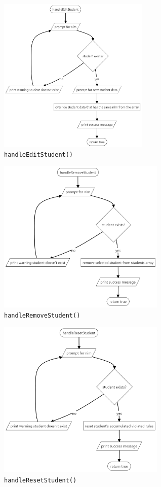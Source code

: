 \documentclass[12pt,titlepage]{article}
\begin{document}
\begin{figure}[h]
    \centering
    \includegraphics[width=7.2cm]{flowcharts/handle-edit-student.png}
    \caption{\texttt{handleEditStudent()}}
\end{figure}

\pagebreak

\begin{figure}[h]
    \centering
    \includegraphics[width=8cm]{flowcharts/handle-remove-student.png}
    \caption{\texttt{handleRemoveStudent()}}
\end{figure}

\begin{figure}[h]
    \centering
    \includegraphics[width=8cm]{flowcharts/handle-reset-student.png}
    \caption{\texttt{handleResetStudent()}}
\end{figure}
\end{document}
